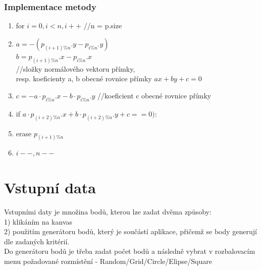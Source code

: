 \documentclass[a4paper, 12pt]{article}
\begin{document}
\subsubsection{Implementace metody}
\begin{enumerate}
	
	\item for $i = 0, i< n, i++$ //n = p.size
	\item \hspace{1.5cm} $a = -(p_{(i+1)\%n}.y - p_{i\%n}.y)$\\ 
	\indent \hspace{1.5cm} $b = p_{(i+1)\%n}.x - p_{i\%n}.x$ \\
	\indent \hspace{1.5cm}//složky normálového vektoru přímky,\\ 
	\indent \hspace{1.5cm} resp. koeficienty a, b obecné rovnice přímky $ax+by+c = 0$
	\item \hspace{1.5cm} $c = - a \cdot p_{i\%n}.x - b \cdot p_{i\%n}.y$ //koeficient c obecné rovnice přímky
	\item \hspace{1.5cm} if $a\cdot p_{(i+2)\%n}.x + b \cdot p_{(i+2)\%n}.y +c == 0)$: 
	\item \hspace{2.5cm}erase $p_{(i+1)\%n}$
	\item \hspace{2.5cm}$i -- , n --	$
	
\end{enumerate}

\clearpage

\section{Vstupní data}

Vstupními daty je množina bodů, kterou lze zadat dvěma způsoby:\\
1) klikáním na kanvas\\
2) použitím generátoru bodů, který je součástí aplikace, přičemž se body generují dle zadaných kritérií.\\


 Do generátoru bodů je třeba zadat počet bodů a následně vybrat v rozbalovacím menu 
 požadované rozmístění - Random/Grid/Circle/Elipse/Square 
\end{document}
